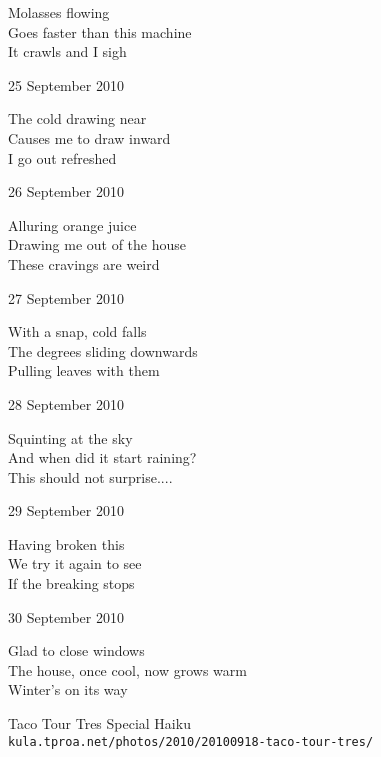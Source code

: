 \documentclass[12pt]{article}
\begin{document}
Molasses flowing \\
Goes faster than this machine \\
It crawls and I sigh

25 September 2010

The cold drawing near \\
Causes me to draw inward \\
I go out refreshed

26 September 2010

Alluring orange juice \\
Drawing me out of the house \\
These cravings are weird

27 September 2010

With a snap, cold falls \\
The degrees sliding downwards \\
Pulling leaves with them

28 September 2010

Squinting at the sky \\
And when did it start raining? \\
This should not surprise....

29 September 2010

Having broken this \\
We try it again to see \\
If the breaking stops

30 September 2010

Glad to close windows \\
The house, once cool, now grows warm \\
Winter's on its way


\newpage

\begin{center}
Taco Tour Tres Special Haiku \\
{\tt kula.tproa.net/photos/2010/20100918-taco-tour-tres/ }
\end{center}
\end{document}
